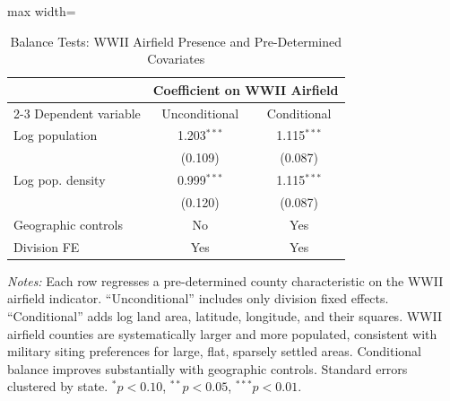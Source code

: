 \begin{table}[t]
\centering
\caption{Balance Tests: WWII Airfield Presence and Pre-Determined Covariates}
\label{tab:balance}
\begin{adjustbox}{max width=\textwidth}
\begin{tabular}{lcc}
\toprule
 & \multicolumn{2}{c}{Coefficient on WWII Airfield} \\
\cmidrule(lr){2-3}
Dependent variable & Unconditional & Conditional \\
\midrule
\addlinespace
    Log population & 1.203$^{***}$ & 1.115$^{***}$ \\
      & (0.109) & (0.087) \\
\addlinespace
    Log pop. density & 0.999$^{***}$ & 1.115$^{***}$ \\
      & (0.120) & (0.087) \\
\addlinespace
\midrule
Geographic controls & No & Yes \\
Division FE & Yes & Yes \\
\bottomrule
\end{tabular}
\end{adjustbox}
\par\vspace{0.3em}
{\footnotesize
\textit{Notes:} Each row regresses a pre-determined county characteristic on the WWII airfield indicator. ``Unconditional'' includes only division fixed effects. ``Conditional'' adds log land area, latitude, longitude, and their squares. WWII airfield counties are systematically larger and more populated, consistent with military siting preferences for large, flat, sparsely settled areas. Conditional balance improves substantially with geographic controls. Standard errors clustered by state. $^{*}p<0.10$, $^{**}p<0.05$, $^{***}p<0.01$.
}
\end{table}
